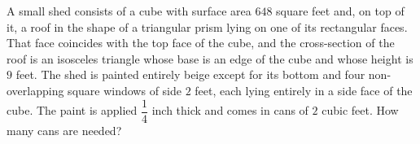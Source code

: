 A small shed consists of a cube with surface area $648$ square feet and, on top of it, a roof in the shape of a triangular prism lying on one of its rectangular faces. That face coincides with the top face of the cube, and the cross-section of the roof is an isosceles triangle whose base is an edge of the cube and whose height is $9$ feet. The shed is painted entirely beige except for its bottom and four non-overlapping square windows of side $2$ feet, each lying entirely in a side face of the cube. The paint is applied $\dfrac14$ inch thick and comes in cans of $2$ cubic feet. How many cans are needed?
